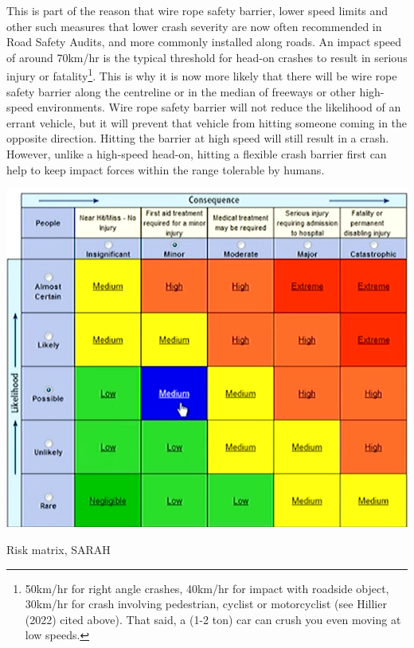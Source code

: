 \documentclass{tufte-handout}
\begin{document}
This is part of the reason that wire rope safety barrier, lower speed limits and other such measures that lower crash severity are now often recommended in Road Safety Audits, and more commonly installed along roads. An impact speed of around 70km/hr is the typical threshold for head-on crashes to result in serious injury or fatality\footnote{50km/hr for right angle crashes, 40km/hr for impact with roadside object, 30km/hr for crash involving pedestrian, cyclist or motorcyclist (see Hillier (2022) cited above). That said, a (1-2 ton) car can crush you even moving at low speeds.}. This is why it is now more likely that there will be wire rope safety barrier along the centreline or in the median of freeways or other high-speed environments. Wire rope safety barrier will not reduce the likelihood of an errant vehicle, but it will prevent that vehicle from hitting someone coming in the opposite direction. Hitting the barrier at high speed will still result in a crash. However, unlike a high-speed head-on, hitting a flexible crash barrier first can help to keep impact forces within the range tolerable by humans\cite{TAC:2016aa}.  

\begin{marginfigure}
\includegraphics{SARAH_risk_matrix}
\caption{Risk matrix, SARAH}
\label{fig:SARAH}
\end{marginfigure}
\end{document}
